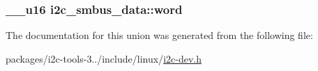 \subsubsection[{word}]{\setlength{\rightskip}{0pt plus 5cm}\+\_\+\+\_\+u16 i2c\+\_\+smbus\+\_\+data\+::word}\label{unioni2c__smbus__data_adcbf2a0d0c112b6a77b35b3125f15e77}


The documentation for this union was generated from the following file\+:\begin{DoxyCompactItemize}
\item 
packages/i2c-\/tools-\/3../include/linux/\hyperlink{i2c-tools-3_81_81_2include_2linux_2i2c-dev_8h}{i2c-\/dev.\+h}\end{DoxyCompactItemize}
